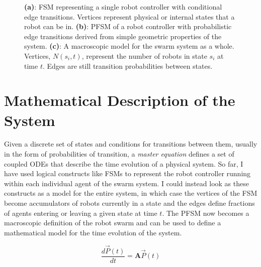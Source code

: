 \documentclass[12pt]{book}
\newcommand{\D}[2]{\frac{d#1}{d#2}}
\begin{document}
\begin{figure}[!tb]
\begin{subfigure}[t]{.4\textwidth}
	\caption{}\label{fig:pfsmmacro}
	\end{subfigure}
\caption{\textbf{(a)}: FSM representing a single robot controller with conditional edge transitions. Vertices represent physical or internal states that a robot can be in. \textbf{(b)}: PFSM of a robot controller with probabilistic edge transitions derived from simple geometric properties of the system. \textbf{(c)}: A macroscopic model for the swarm system as a whole. Vertices, $N(s_i, t)$, represent the number of robots in state $s_i$ at time $t$. Edges are still transition probabilities between states.}\label{fig:allfsm}
\end{figure}

\section{Mathematical Description of the\\System}
Given a discrete set of states and conditions for transitions between them, usually in the form of probabilities of transition, a \emph{master equation} defines a set of coupled ODEs that describe the time evolution of a physical system. So far, I have used logical constructs like FSMs to represent the robot controller running within each individual agent of the swarm system. I could instead look as these constructs as a model for the entire system, in which case the vertices of the FSM become accumulators of robots currently in a state and the edges define fractions of agents entering or leaving a given state at time $t$. The PFSM now becomes a macroscopic definition of the robot swarm and can be used to define a mathematical model for the time evolution of the system.

\begin{equation}
\D{\vec{P}(t)}{t} = \mathbf{A}\vec{P}(t)\label{eq:firstmaster}
\end{equation}
\end{document}
